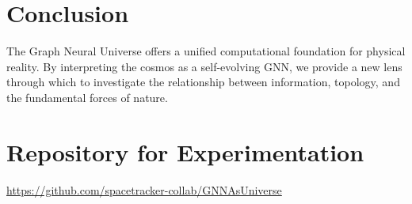 \documentclass[12pt]{article}
\begin{document}
\section{Conclusion}
The Graph Neural Universe offers a unified computational foundation for physical reality. By interpreting the cosmos as a self-evolving GNN, we provide a new lens through which to investigate the relationship between information, topology, and the fundamental forces of nature.

\section{Repository for Experimentation}
\noindent
\url{https://github.com/spacetracker-collab/GNNAsUniverse}
\end{document}
